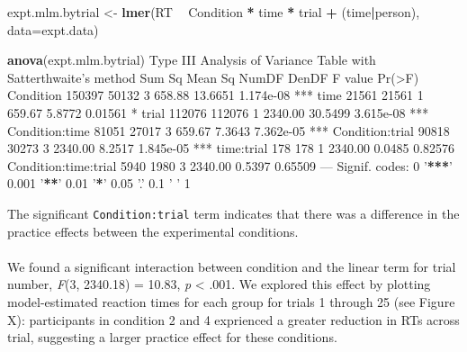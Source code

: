 \documentclass[]{article}
\newenvironment{Shaded}{\begin{snugshade}}{\end{snugshade}}
\newcommand{\DataTypeTok}[1]{\textcolor[rgb]{0.13,0.29,0.53}{#1}}
\newcommand{\ErrorTok}[1]{\textcolor[rgb]{0.64,0.00,0.00}{\textbf{#1}}}
\newcommand{\KeywordTok}[1]{\textcolor[rgb]{0.13,0.29,0.53}{\textbf{#1}}}
\newcommand{\NormalTok}[1]{#1}
\newcommand{\OperatorTok}[1]{\textcolor[rgb]{0.81,0.36,0.00}{\textbf{#1}}}
\newcommand{\StringTok}[1]{\textcolor[rgb]{0.31,0.60,0.02}{#1}}
\let\oldparagraph\paragraph
\renewcommand{\paragraph}[1]{\oldparagraph{#1}\mbox{}}
\begin{document}
\begin{Shaded}
\begin{Highlighting}[]
\NormalTok{expt.mlm.bytrial <-}\StringTok{ }\KeywordTok{lmer}\NormalTok{(RT }\OperatorTok{~}\StringTok{ }\NormalTok{Condition }\OperatorTok{*}\StringTok{ }\NormalTok{time }\OperatorTok{*}\StringTok{ }\NormalTok{trial }\OperatorTok{+}
\StringTok{    }\NormalTok{(time}\OperatorTok{|}\NormalTok{person),}
    \DataTypeTok{data=}\NormalTok{expt.data)}

\KeywordTok{anova}\NormalTok{(expt.mlm.bytrial)}
\NormalTok{Type III Analysis of Variance Table with Satterthwaite}\StringTok{'s method}
\StringTok{                     Sum Sq Mean Sq NumDF   DenDF F value    Pr(>F)    }
\StringTok{Condition            150397   50132     3  658.88 13.6651 1.174e-08 ***}
\StringTok{time                  21561   21561     1  659.67  5.8772   0.01561 *  }
\StringTok{trial                112076  112076     1 2340.00 30.5499 3.615e-08 ***}
\StringTok{Condition:time        81051   27017     3  659.67  7.3643 7.362e-05 ***}
\StringTok{Condition:trial       90818   30273     3 2340.00  8.2517 1.845e-05 ***}
\StringTok{time:trial              178     178     1 2340.00  0.0485   0.82576    }
\StringTok{Condition:time:trial   5940    1980     3 2340.00  0.5397   0.65509    }
\StringTok{---}
\StringTok{Signif. codes:  0 '}\OperatorTok{**}\ErrorTok{*}\StringTok{' 0.001 '}\OperatorTok{**}\StringTok{' 0.01 '}\OperatorTok{*}\StringTok{' 0.05 '}\NormalTok{.}\StringTok{' 0.1 '} \StringTok{' 1}
\end{Highlighting}
\end{Shaded}

The significant \texttt{Condition:trial} term indicates that there was a difference in
the practice effects between the experimental conditions.

\hypertarget{section-11}{%
\paragraph{}\label{section-11}}

We found a significant interaction between condition and the linear term for
trial number, \emph{F}(3, 2340.18) = 10.83, \emph{p} \textless{} .001. We explored this effect by
plotting model-estimated reaction times for each group for trials 1 through 25
(see Figure X): participants in condition 2 and 4 exprienced a greater reduction
in RTs across trial, suggesting a larger practice effect for these conditions.
\end{document}
